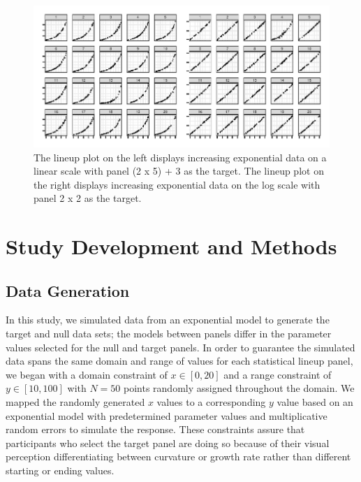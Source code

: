 \documentclass[12pt]{article}
\begin{document}
\begin{figure}[tbp]

{\centering \includegraphics[width=\linewidth,]{logarithmic-lineups_files/figure-latex/lineup-example-1} 

}

\caption[Lineup examples]{The lineup plot on the left displays increasing exponential data on a linear scale with panel (2 x 5) + 3 as the target. The lineup plot on the right displays increasing exponential data on the log scale with panel 2 x 2 as the target.}\label{fig:lineup-example}
\end{figure}

\hypertarget{methods}{%
\section{Study Development and Methods}\label{methods}}

\hypertarget{data-generation}{%
\subsection{Data Generation}\label{data-generation}}

In this study, we simulated data from an exponential model to generate
the target and null data sets; the models between panels differ in the
parameter values selected for the null and target panels. In order to
guarantee the simulated data spans the same domain and range of values
for each statistical lineup panel, we began with a domain constraint of
\(x\in [0,20]\) and a range constraint of \(y\in [10,100]\) with
\(N = 50\) points randomly assigned throughout the domain. We mapped the
randomly generated \(x\) values to a corresponding \(y\) value based on
an exponential model with predetermined parameter values and
multiplicative random errors to simulate the response. These constraints
assure that participants who select the target panel are doing so
because of their visual perception differentiating between curvature or
growth rate rather than different starting or ending values.
\end{document}
